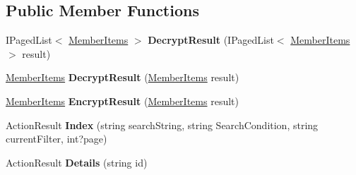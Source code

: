 \subsection*{Public Member Functions}
\begin{DoxyCompactItemize}
\item 
I\+Paged\+List$<$ \hyperlink{class_cloud_bread_admin_web_1_1_member_items}{Member\+Items} $>$ {\bfseries Decrypt\+Result} (I\+Paged\+List$<$ \hyperlink{class_cloud_bread_admin_web_1_1_member_items}{Member\+Items} $>$ result)\hypertarget{class_cloud_bread_admin_web_1_1_controllers_1_1_x___x_member_items_controller_ae8b527d95b2dcb97a305f574517d2947}{}\label{class_cloud_bread_admin_web_1_1_controllers_1_1_x___x_member_items_controller_ae8b527d95b2dcb97a305f574517d2947}

\item 
\hyperlink{class_cloud_bread_admin_web_1_1_member_items}{Member\+Items} {\bfseries Decrypt\+Result} (\hyperlink{class_cloud_bread_admin_web_1_1_member_items}{Member\+Items} result)\hypertarget{class_cloud_bread_admin_web_1_1_controllers_1_1_x___x_member_items_controller_a17160bc80e3e08a5253435215d7926f7}{}\label{class_cloud_bread_admin_web_1_1_controllers_1_1_x___x_member_items_controller_a17160bc80e3e08a5253435215d7926f7}

\item 
\hyperlink{class_cloud_bread_admin_web_1_1_member_items}{Member\+Items} {\bfseries Encrypt\+Result} (\hyperlink{class_cloud_bread_admin_web_1_1_member_items}{Member\+Items} result)\hypertarget{class_cloud_bread_admin_web_1_1_controllers_1_1_x___x_member_items_controller_ac500198a4eb761c52b817497df717395}{}\label{class_cloud_bread_admin_web_1_1_controllers_1_1_x___x_member_items_controller_ac500198a4eb761c52b817497df717395}

\item 
Action\+Result {\bfseries Index} (string search\+String, string Search\+Condition, string current\+Filter, int?page)\hypertarget{class_cloud_bread_admin_web_1_1_controllers_1_1_x___x_member_items_controller_affdc71723cb80c4d3ba78a5e806a91d2}{}\label{class_cloud_bread_admin_web_1_1_controllers_1_1_x___x_member_items_controller_affdc71723cb80c4d3ba78a5e806a91d2}

\item 
Action\+Result {\bfseries Details} (string id)\hypertarget{class_cloud_bread_admin_web_1_1_controllers_1_1_x___x_member_items_controller_a71a5ae8dad765ccfe9e52d3344e43baf}{}\label{class_cloud_bread_admin_web_1_1_controllers_1_1_x___x_member_items_controller_a71a5ae8dad765ccfe9e52d3344e43baf}


\end{DoxyCompactItemize}
